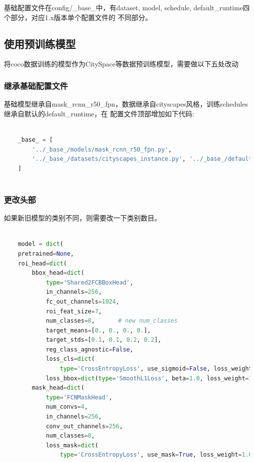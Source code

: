 \documentclass[UTF8]{ctexart}
\begin{document}
基础配置文件在config/\_base\_中，有dataset, model, schedule, default\_runtime四个部分，对应1.x版本单个配置文件的
不同部分。


\subsection{使用预训练模型}
将coco数据训练的模型作为CitySpace等数据预训练模型，需要做以下五处改动

\subsubsection{继承基础配置文件}
基础模型继承自mask\_rcnn\_r50\_fpn，数据继承自cityscapes风格，训练schedules继承自默认的default\_runtime，在
配置文件顶部增加如下代码:

\lstset{style=mystyle}
\begin{lstlisting}[language=Python]

	_base_ = [
		'../_base_/models/mask_rcnn_r50_fpn.py',
		'../_base_/datasets/cityscapes_instance.py', '../_base_/default_runtime.py'
	]
	
\end{lstlisting}

\subsubsection{更改头部}
如果新旧模型的类别不同，则需要改一下类别数目。

\lstset{style=mystyle}
\begin{lstlisting}[language=Python]

	model = dict(
    pretrained=None,
    roi_head=dict(
        bbox_head=dict(
            type='Shared2FCBBoxHead',
            in_channels=256,
            fc_out_channels=1024,
            roi_feat_size=7,
            num_classes=8,　　　　# new num_classes
            target_means=[0., 0., 0., 0.],
            target_stds=[0.1, 0.1, 0.2, 0.2],
            reg_class_agnostic=False,
            loss_cls=dict(
                type='CrossEntropyLoss', use_sigmoid=False, loss_weight=1.0),
            loss_bbox=dict(type='SmoothL1Loss', beta=1.0, loss_weight=1.0)),
        mask_head=dict(
            type='FCNMaskHead',
            num_convs=4,
            in_channels=256,
            conv_out_channels=256,
            num_classes=8,
            loss_mask=dict(
                type='CrossEntropyLoss', use_mask=True, loss_weight=1.0)))
	
\end{lstlisting}
\end{document}
